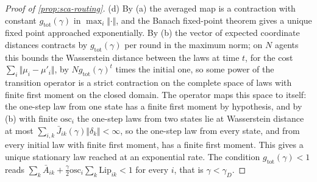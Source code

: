 \begin{proof}[Proof of \cref{prop:sca-routing}]
(d) By (a) the averaged map is a contraction with constant $g_{\mathrm{tot}}(\gamma)$ in $\max_i\Vert\cdot\Vert$, and the Banach fixed-point theorem gives a unique fixed point approached exponentially. By (b) the vector of expected coordinate distances contracts by $g_{\mathrm{tot}}(\gamma)$ per round in the maximum norm; on $N$ agents this bounds the Wasserstein distance between the laws at time $t$, for the cost $\sum_i\Vert\mu_i-\mu'_i\Vert$, by $Ng_{\mathrm{tot}}(\gamma)^t$ times the initial one, so some power of the transition operator is a strict contraction on the complete space of laws with finite first moment on the closed domain. The operator maps this space to itself: the one-step law from one state has a finite first moment by hypothesis, and by (b) with finite $\mathrm{osc}_i$ the one-step laws from two states lie at Wasserstein distance at most $\sum_{i,k}\bar J_{ik}(\gamma)\Vert\delta_k\Vert<\infty$, so the one-step law from every state, and from every initial law with finite first moment, has a finite first moment. This gives a unique stationary law reached at an exponential rate. The condition $g_{\mathrm{tot}}(\gamma)<1$ reads $\sum_k\bar A_{ik}+\frac\gamma2\mathrm{osc}_i\sum_k\mathrm{Lip}_{ik}<1$ for every $i$, that is $\gamma<\gamma_D$.
\end{proof}

